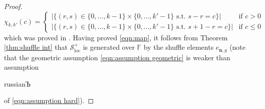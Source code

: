 \documentclass{amsart}
\def\BF{{\mathbb{F}}}
\def\CS{{\mathcal{S}}}
\def\bn{{\boldsymbol{n}}}
\def\field{\BF}
\def\hard{\begin{otherlanguage*}{russian}Ъ \end{otherlanguage*}}
\begin{document}
\begin{proof}
\begin{equation}
\label{eqn:explicit chi}
\chi_{k,k'}(c) = \begin{cases} \Big| \{ (r,s) \in \{0,\dots,k-1\} \times \{0,\dots, k'-1\} \text{ s.t. } s-r = c  \} \Big| &\text{if }c > 0 \\ \Big| \{ (r,s) \in \{0,\dots,k-1\} \times \{0,\dots, k'-1\} \text{ s.t. } s+1-r = c \} \Big| &\text{if }c \leq 0 \end{cases}
\end{equation}
which was proved in \cite[Subsection 5.1]{JNCoulomb}. Having proved \eqref{eqn:map}, it follows from Theorem \ref{thm:shuffle int} that $\CS^+_{\text{loc}}$ is generated over $\field$ by the shuffle elements $e_{\bn,g}$ (note that the geometric assumption \eqref{eqn:assumption geometric} is weaker than assumption \hard of \eqref{eqn:assumption hard}). 

\medskip 


\end{proof}
\end{document}
